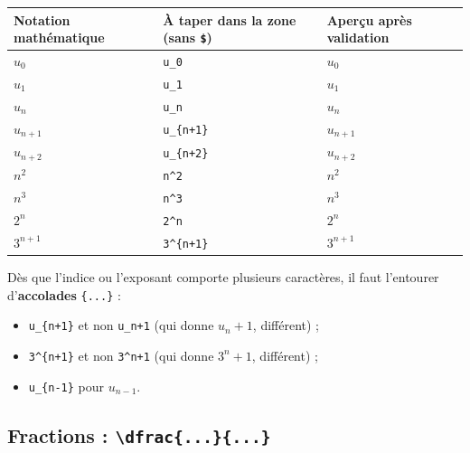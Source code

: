 \documentclass[11pt,a4paper]{article}
\begin{document}
\begin{center}
\renewcommand{\arraystretch}{1.35}
\footnotesize
\begin{tabular}{@{}p{4.2cm}p{5.6cm}p{4.2cm}@{}}
\toprule
\textbf{Notation mathématique} & \textbf{À taper dans la zone (sans \texttt{\$})} & \textbf{Aperçu après validation} \\
\midrule
\(u_0\)      & \verb|u_0|               & \(u_0\) \\
\(u_1\)      & \verb|u_1|               & \(u_1\) \\
\(u_n\)      & \verb|u_n|               & \(u_n\) \\
\(u_{n+1}\)  & \verb|u_{n+1}|           & \(u_{n+1}\) \\
\(u_{n+2}\)  & \verb|u_{n+2}|           & \(u_{n+2}\) \\
\(n^2\)      & \verb|n^2|               & \(n^2\) \\
\(n^3\)      & \verb|n^3|               & \(n^3\) \\
\(2^n\)      & \verb|2^n|               & \(2^n\) \\
\(3^{n+1}\)  & \verb|3^{n+1}|           & \(3^{n+1}\) \\
\bottomrule
\end{tabular}
\end{center}

\begin{attention}
Dès que l'indice ou l'exposant comporte plusieurs caractères, il faut
l'entourer d'\textbf{accolades} \verb|{...}| :
\begin{itemize}
  \item \verb|u_{n+1}| et non \verb|u_n+1| (qui donne \(u_n + 1\), différent) ;
  \item \verb|3^{n+1}| et non \verb|3^n+1| (qui donne \(3^n + 1\), différent) ;
  \item \verb|u_{n-1}| pour \(u_{n-1}\).
\end{itemize}
\end{attention}

\subsection{Fractions : \texttt{\textbackslash dfrac\{...\}\{...\}}}
\end{document}
